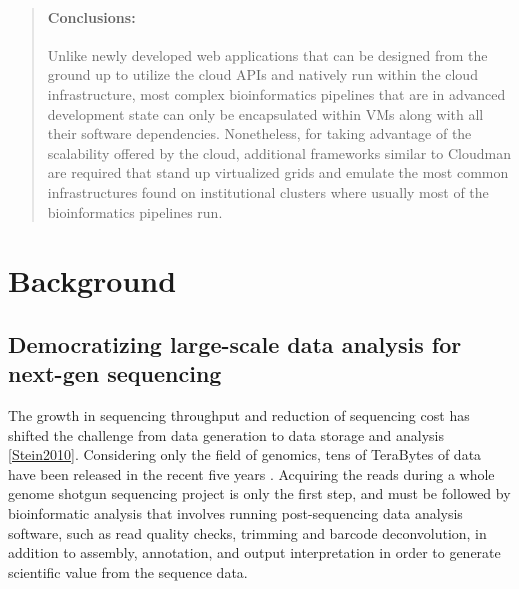 \documentclass[10pt]{bmc_article}
\newenvironment{bmcformat}{\baselineskip20pt\sloppy\setboolean{publ}{false}}{\baselineskip20pt\sloppy}
\begin{document}
\begin{bmcformat}
\begin{abstract}
\paragraph*{Conclusions:} Unlike newly developed web applications that can be designed from the ground up to utilize the cloud 
APIs and natively run within the cloud infrastructure, most complex bioinformatics pipelines that are in advanced development state 
can only be encapsulated within VMs along with all their software dependencies. Nonetheless, for taking advantage of the scalability 
offered by the cloud, additional frameworks similar to Cloudman are required that stand up virtualized grids and emulate the most 
common infrastructures found on institutional clusters where usually most of the bioinformatics pipelines run.

\end{abstract}










\section*{Background}

\subsection*{Democratizing large-scale data analysis for next-gen sequencing}

The growth in sequencing throughput and reduction of sequencing cost has shifted the challenge from data 
generation to data storage and analysis \ref{Stein2010}. Considering only the field of genomics, tens of TeraBytes 
of data have been released in the recent five years \cite{Mason2012}. Acquiring the reads during a whole genome shotgun 
sequencing project is only the first step, and must be followed by bioinformatic analysis that involves running 
post-sequencing data analysis software, such as read quality checks, trimming and barcode deconvolution, in 
addition to assembly, annotation, and output interpretation in order to generate scientific value from the sequence 
data. \pb


\end{bmcformat}
\end{document}
